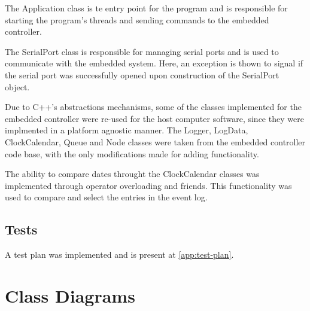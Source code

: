 \documentclass[10pt,twocolumn,letterpaper]{article}
\begin{document}
The Application class is te entry point for the program and is responsible for starting the program's threads and sending commands to the embedded controller.

The SerialPort class is responsible for managing serial ports and is used to communicate with the embedded system. Here, an exception is thown to signal if the serial port was successfully opened upon construction of the SerialPort object.

Due to C++'s abstractions mechanisms, some of the classes implemented for the embedded controller were re-used for the host computer software, since they were implmented in a platform agnostic manner.
The Logger, LogData, ClockCalendar, Queue and Node classes were taken from the embedded controller code base, with the only modifications made for adding functionality.

The ability to compare dates throught the ClockCalendar classes was implemented through operator overloading and friends. This functionality was used to compare and select the entries in the event log.


\subsection{Tests}

A test plan was implemented and is present at \autoref{app:test-plan}.

\onecolumn

\appendix
\appendixpage

\section{Class Diagrams} \label{app:class-diagrams}
\end{document}
